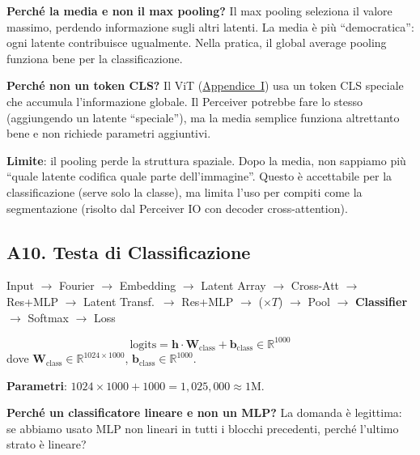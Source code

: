 \documentclass[12pt,a4paper]{article}
\begin{document}
\begin{notabox}
\textbf{Perch\'e la media e non il max pooling?} Il max pooling seleziona il valore massimo, perdendo informazione sugli altri latenti. La media \`e pi\`u ``democratica'': ogni latente contribuisce ugualmente. Nella pratica, il global average pooling funziona bene per la classificazione.

\textbf{Perch\'e non un token CLS?} Il ViT (\hyperref[app:vit]{Appendice~I}) usa un token CLS speciale che accumula l'informazione globale. Il Perceiver potrebbe fare lo stesso (aggiungendo un latente ``speciale''), ma la media semplice funziona altrettanto bene e non richiede parametri aggiuntivi.

\textbf{Limite}: il pooling perde la struttura spaziale. Dopo la media, non sappiamo pi\`u ``quale latente codifica quale parte dell'immagine''. Questo \`e accettabile per la classificazione (serve solo la classe), ma limita l'uso per compiti come la segmentazione (risolto dal Perceiver IO con decoder cross-attention).
\end{notabox}


\subsection{A10. Testa di Classificazione} \label{sec:classificatore}

\begin{pipelinebox}
Input $\to$ Fourier $\to$ Embedding $\to$ Latent Array $\to$ Cross-Att $\to$ Res+MLP $\to$ Latent Transf.\ $\to$ Res+MLP $\to$ ($\times T$) $\to$ Pool $\to$ \textbf{Classifier} $\to$ Softmax $\to$ Loss
\end{pipelinebox}

\begin{formulabox}
\[
    \text{logits} = \mathbf{h} \cdot \mathbf{W}_{\text{class}} + \mathbf{b}_{\text{class}} \in \mathbb{R}^{1000}
\]
dove $\mathbf{W}_{\text{class}} \in \mathbb{R}^{1024 \times 1000}$, $\mathbf{b}_{\text{class}} \in \mathbb{R}^{1000}$.

\textbf{Parametri}: $1024 \times 1000 + 1000 = 1{,}025{,}000 \approx 1$M.
\end{formulabox}

\textbf{Perch\'e un classificatore lineare e non un MLP?} La domanda \`e legittima: se abbiamo usato MLP non lineari in tutti i blocchi precedenti, perch\'e l'ultimo strato \`e lineare?
\end{document}
